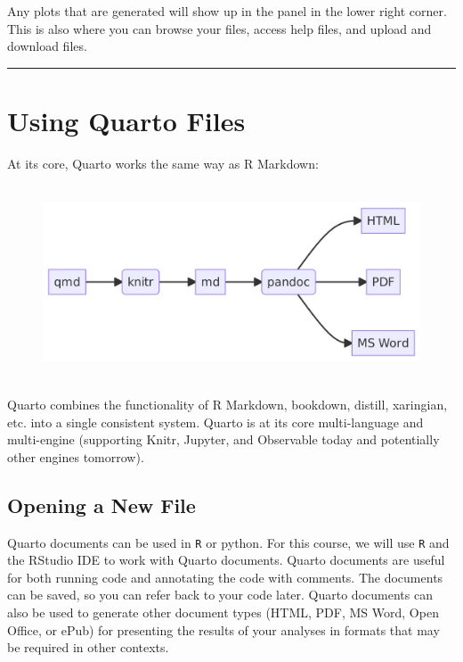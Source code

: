 \documentclass[
  letterpaper,
  DIV=11,
  numbers=noendperiod]{scrartcl}
\begin{document}
Any plots that are generated will show up in the panel in the lower
right corner. This is also where you can browse your files, access help
files, and upload and download files.

\begin{center}\rule{0.5\linewidth}{0.5pt}\end{center}

\hypertarget{using-quarto-files}{%
\section{Using Quarto Files}\label{using-quarto-files}}

At its core, Quarto works the same way as R Markdown:

\begin{figure}[H]

{\centering \includegraphics[width=5.41in,height=2.27in]{PS01_source_files/figure-latex/mermaid-figure-1.png}

}

\end{figure}

Quarto combines the functionality of R Markdown, bookdown, distill,
xaringian, etc. into a single consistent system. Quarto is at its core
multi-language and multi-engine (supporting Knitr, Jupyter, and
Observable today and potentially other engines tomorrow).

\hypertarget{opening-a-new-file}{%
\subsection{Opening a New File}\label{opening-a-new-file}}

Quarto documents can be used in \texttt{R} or python. For this course,
we will use \texttt{R} and the RStudio IDE to work with Quarto
documents. Quarto documents are useful for both running code and
annotating the code with comments. The documents can be saved, so you
can refer back to your code later. Quarto documents can also be used to
generate other document types (HTML, PDF, MS Word, Open Office, or ePub)
for presenting the results of your analyses in formats that may be
required in other contexts.
\end{document}
